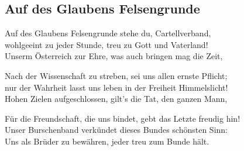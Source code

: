
\subsection*{Auf des Glaubens Felsengrunde}
%
%
\nopagebreak
\hfill%
%
\nopagebreak
\thestrophe Auf des Glaubens Felsengrunde stehe du, Cartellverband, \\
wohlgeeint zu jeder Stunde, treu zu Gott und Vaterland! \\
Unserm Österreich zur Ehre, was auch bringen mag die Zeit, \\

\thestrophe Nach der Wissenschaft zu streben, sei uns allen ernste Pflicht; \\
nur der Wahrheit lasst uns leben in der Freiheit Himmelslicht! \\
Hohen Zielen aufgeschlossen, gilt's die Tat, den ganzen Mann, \\

\thestrophe Für die Freundschaft, die uns bindet, gebt das Letzte freudig hin! \\
Unser Burschenband verkündet dieses Bundes schönsten Sinn: \\
Uns als Brüder zu bewähren, jeder treu zum Bunde hält.\\
